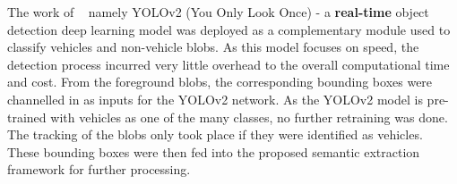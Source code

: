 





The work of ~ namely YOLOv2 (You Only Look Once) - a \textbf{real-time} object detection deep learning model was deployed as a complementary module used to classify vehicles and non-vehicle blobs.
As this model focuses on speed, the detection process incurred very little overhead to the overall computational time and cost.
From the foreground blobs, the corresponding bounding boxes were channelled in as inputs for the YOLOv2 network.
As the YOLOv2 model is pre-trained with vehicles as one of the many classes, no further retraining was done. The tracking of the blobs only took place if they were identified as vehicles. These bounding boxes were then fed into the proposed semantic extraction framework for further processing.


